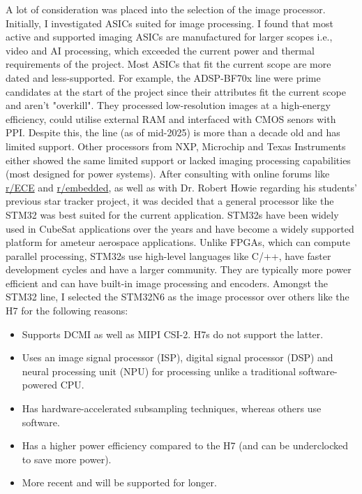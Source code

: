 A lot of consideration was placed into the selection of the image processor. Initially, I investigated ASICs suited for image processing. I found that most active and supported imaging ASICs are manufactured for larger scopes i.e., video and AI processing, which exceeded the current power and thermal requirements of the project.
Most ASICs that fit the current scope are more dated and less-supported. For example, the ADSP-BF70x line were prime candidates at the start of the project since their attributes fit the current scope and aren't "overkill". They processed low-resolution images at a high-energy efficiency, could utilise external RAM and interfaced with CMOS senors with PPI.
Despite this, the line (as of mid-2025) is more than a decade old and has limited support. Other processors from NXP, Microchip and Texas Instruments either showed the same limited support or lacked imaging processing capabilities (most designed for power systems).
After consulting with online forums like \href{https://www.reddit.com/r/ECE/comments/1mizdoo/best_asic_for_image_processing/}{r/ECE} and \href{https://www.reddit.com/r/embedded/comments/1mfv3zn/comment/n6kd7jb/}{r/embedded}, as well as with Dr. Robert Howie regarding his students' previous star tracker project, it was decided that a general processor like the STM32 was best suited for the current application.
\nl
STM32s have been widely used in CubeSat applications over the years and have become a widely supported platform for ameteur aerospace applications. Unlike FPGAs, which can compute parallel processing, STM32s use high-level languages like C/++, have faster development cycles and have a larger community. They are typically more power efficient and can have built-in image processing and encoders.
Amongst the STM32 line, I selected the STM32N6 as the image processor over others like the H7 for the following reasons:
\begin{itemize}
    \item Supports DCMI as well as MIPI CSI-2. H7s do not support the latter.
    \item Uses an image signal processor (ISP), digital signal processor (DSP) and neural processing unit (NPU) for processing unlike a traditional software-powered CPU.
    \item Has hardware-accelerated subsampling techniques, whereas others use software.
    \item Has a higher power efficiency compared to the H7 (and can be underclocked to save more power).
    \item More recent and will be supported for longer.
\end{itemize}
